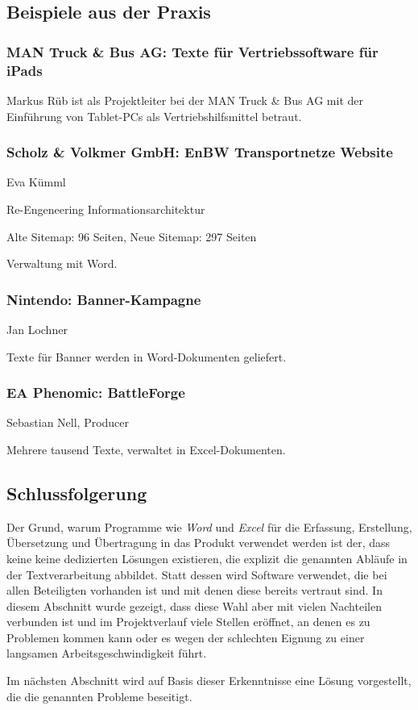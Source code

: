\subsection{Beispiele aus der Praxis}

\subsubsection{MAN Truck \& Bus AG: Texte für Vertriebssoftware für iPads}

Markus Rüb ist als Projektleiter bei der MAN Truck \& Bus AG mit der Einführung von Tablet-PCs als Vertriebshilfsmittel betraut.

\subsubsection{Scholz \& Volkmer GmbH: EnBW Transportnetze Website}

Eva Kümml

Re-Engeneering Informationsarchitektur

Alte Sitemap: 96 Seiten, Neue Sitemap: 297 Seiten

Verwaltung mit Word.

\subsubsection{Nintendo: Banner-Kampagne}

Jan Lochner

Texte für Banner werden in Word-Dokumenten geliefert.

\subsubsection{EA Phenomic: BattleForge}

Sebastian Nell, Producer

Mehrere tausend Texte, verwaltet in Excel-Dokumenten.

\subsection{Schlussfolgerung}


Der Grund, warum Programme wie \emph{Word} und \emph{Excel} für die Erfassung, Erstellung, Übersetzung und Übertragung in das Produkt verwendet werden ist der, dass keine keine dedizierten Lösungen existieren, die explizit die genannten Abläufe in der Textverarbeitung abbildet. Statt dessen wird Software verwendet, die bei allen Beteiligten vorhanden ist und mit denen diese bereits vertraut sind. In diesem Abschnitt wurde gezeigt, dass diese Wahl aber mit vielen Nachteilen verbunden ist und im Projektverlauf viele Stellen eröffnet, an denen es zu Problemen kommen kann oder es wegen der schlechten Eignung zu einer langsamen Arbeitsgeschwindigkeit führt.

Im nächsten Abschnitt wird auf Basis dieser Erkenntnisse eine Lösung vorgestellt, die die genannten Probleme beseitigt.
